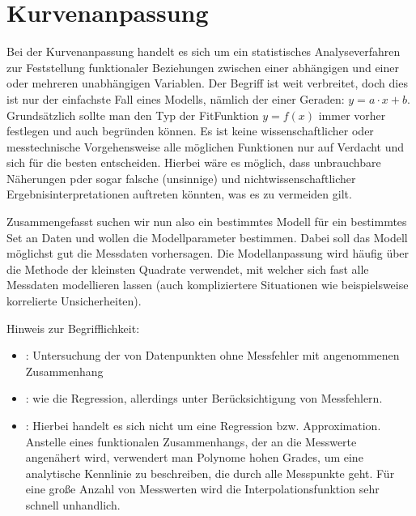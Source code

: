 \documentclass[letterpaper,10pt,english]{jupyterBook}
\begin{document}
\section{Kurvenanpassung}
\label{\detokenize{content/1_Kurvenanpassung:kurvenanpassung}}\label{\detokenize{content/1_Kurvenanpassung::doc}}
\sphinxAtStartPar
Bei der Kurvenanpassung handelt es sich um ein statistisches Analyseverfahren zur Feststellung funktionaler Beziehungen zwischen einer abhängigen und einer oder mehreren unabhängigen Variablen. Der Begriff  ist weit verbreitet, doch dies ist nur der einfachste Fall eines Modells, nämlich der einer Geraden: \(y = a \cdot x +b\). Grundsätzlich sollte man den Typ der Fit\sphinxhyphen{}Funktion \(y = f(x)\) immer vorher festlegen und auch begründen können. Es ist keine wissenschaftlicher oder messtechnische Vorgehensweise alle möglichen Funktionen nur auf Verdacht  und sich für die besten entscheiden. Hierbei wäre es möglich, dass unbrauchbare Näherungen pder sogar falsche (unsinnige) und nicht\sphinxhyphen{}wissenschaftlicher Ergebnisinterpretationen auftreten könnten, was es zu vermeiden gilt.

\sphinxAtStartPar
Zusammengefasst suchen wir nun also ein bestimmtes Modell für ein bestimmtes Set an Daten und wollen die Modellparameter bestimmen. Dabei soll das Modell möglichst gut die Messdaten vorhersagen. Die Modellanpassung wird häufig über die Methode der kleinsten Quadrate verwendet, mit welcher sich fast alle Messdaten modellieren lassen (auch kompliziertere Situationen wie beispielsweise korrelierte Unsicherheiten).

\sphinxAtStartPar
Hinweis zur Begrifflichkeit:
\begin{itemize}
\item {} 
\sphinxAtStartPar
{}: Untersuchung der  von Datenpunkten ohne Messfehler mit angenommenen Zusammenhang

\item {} 
\sphinxAtStartPar
{}: wie die Regression, allerdings unter Berücksichtigung von Messfehlern.

\item {} 
\sphinxAtStartPar
{}: Hierbei handelt es sich nicht um eine Regression bzw. Approximation. Anstelle eines funktionalen Zusammenhangs, der an die Messwerte angenähert wird, verwendert man Polynome hohen Grades, um eine analytische Kennlinie zu beschreiben, die  durch alle Messpunkte geht. Für eine große Anzahl von Messwerten wird die Interpolationsfunktion sehr schnell unhandlich.

\end{itemize}
\end{document}
